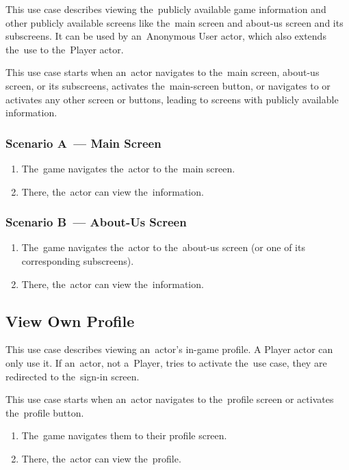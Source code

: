 This use case describes viewing the~publicly available game information and other publicly available screens like the~main screen and about-us screen and its subscreens.
It can be used by an~Anonymous User actor, which also extends the~use to the~Player actor.

This use case starts when an~actor navigates to the~main screen, \mbox{about-us} screen, or its subscreens, activates the~main-screen button, or navigates to or activates any other screen or buttons, leading to screens with publicly available information.

\subsubsection*{Scenario A~--- Main Screen}

\begin{enumerate}
    \item The~game navigates the~actor to the~main screen.
    \item There, the~actor can view the~information.
\end{enumerate}

\subsubsection*{Scenario B~--- About-Us Screen}

\begin{enumerate}
    \item The~game navigates the~actor to the~about-us screen (or one of its \mbox{corresponding} subscreens).
    \item There, the~actor can view the~information.
\end{enumerate}

\subsection{View Own Profile}

This use case describes viewing an~actor's in-game profile.
A Player actor can only use it.
If an~actor, not a~Player, tries to activate the~use case, they are redirected to the~sign-in screen.

This use case starts when an~actor navigates to the~profile screen or activates the~profile button.

\begin{enumerate}
    \item The~game navigates them to their profile screen.
    \item There, the~actor can view the~profile.
\end{enumerate}

